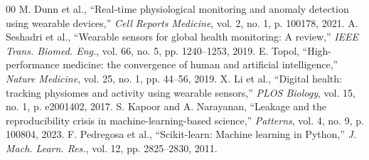 \documentclass[conference]{IEEEtran}
\begin{document}
\begin{thebibliography}{00}
 M. Dunn et al., ``Real-time physiological monitoring and anomaly detection using wearable devices,'' \textit{Cell Reports Medicine}, vol. 2, no. 1, p. 100178, 2021.
 A. Seshadri et al., ``Wearable sensors for global health monitoring: A review,'' \textit{IEEE Trans. Biomed. Eng.}, vol. 66, no. 5, pp. 1240--1253, 2019.
 E. Topol, ``High-performance medicine: the convergence of human and artificial intelligence,'' \textit{Nature Medicine}, vol. 25, no. 1, pp. 44--56, 2019.
 X. Li et al., ``Digital health: tracking physiomes and activity using wearable sensors,'' \textit{PLOS Biology}, vol. 15, no. 1, p. e2001402, 2017.
 S. Kapoor and A. Narayanan, ``Leakage and the reproducibility crisis in machine-learning-based science,'' \textit{Patterns}, vol. 4, no. 9, p. 100804, 2023.
 F. Pedregosa et al., ``Scikit-learn: Machine learning in Python,'' \textit{J. Mach. Learn. Res.}, vol. 12, pp. 2825--2830, 2011.
\end{thebibliography}
\end{document}
